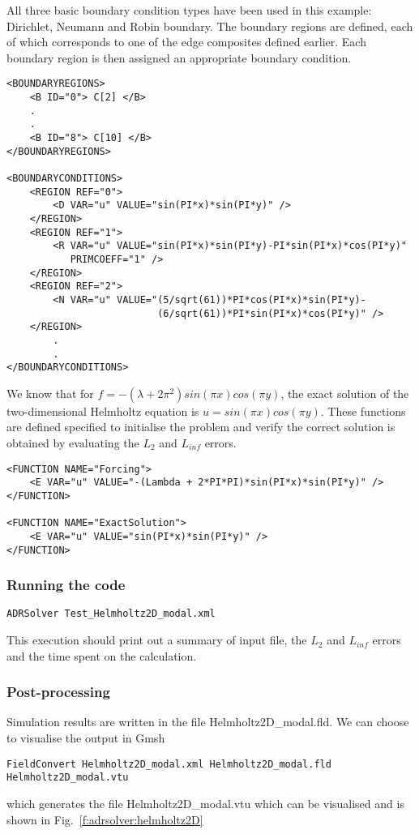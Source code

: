 All three basic boundary condition types have been used in this example:
Dirichlet, Neumann and Robin boundary. The boundary regions are defined, each of
which corresponds to one of the edge composites defined earlier. Each boundary
region is then assigned an appropriate boundary condition.
\begin{lstlisting}[style=XMLStyle]
<BOUNDARYREGIONS>
    <B ID="0"> C[2] </B>
    .
    .
    <B ID="8"> C[10] </B>
</BOUNDARYREGIONS>

<BOUNDARYCONDITIONS>
    <REGION REF="0">
        <D VAR="u" VALUE="sin(PI*x)*sin(PI*y)" />
    </REGION>
    <REGION REF="1">
        <R VAR="u" VALUE="sin(PI*x)*sin(PI*y)-PI*sin(PI*x)*cos(PI*y)" 
           PRIMCOEFF="1" />
    </REGION>
    <REGION REF="2">
        <N VAR="u" VALUE="(5/sqrt(61))*PI*cos(PI*x)*sin(PI*y)-
                          (6/sqrt(61))*PI*sin(PI*x)*cos(PI*y)" />
    </REGION>
        .
        .
</BOUNDARYCONDITIONS>
\end{lstlisting}

We know that for $f = -(\lambda + 2 \pi^2)sin(\pi x)cos(\pi y)$, the exact 
solution of the two-dimensional Helmholtz equation is $u = sin(\pi x)cos(\pi
y)$. These functions are defined specified to initialise the problem and verify
the correct solution is obtained by evaluating the $L_2$ and $L_{inf}$ errors.
\begin{lstlisting}[style=XMLStyle]
<FUNCTION NAME="Forcing">
    <E VAR="u" VALUE="-(Lambda + 2*PI*PI)*sin(PI*x)*sin(PI*y)" />
</FUNCTION>

<FUNCTION NAME="ExactSolution">
    <E VAR="u" VALUE="sin(PI*x)*sin(PI*y)" />
</FUNCTION>
\end{lstlisting}


\subsubsection{Running the code}
\begin{lstlisting}[style=BashInputStyle]
ADRSolver Test_Helmholtz2D_modal.xml
\end{lstlisting}

This execution should print out a summary of input file, the $L_2$ and 
$L_{inf}$ errors and the time spent on the calculation.

\subsubsection{Post-processing}
Simulation results are written in the file Helmholtz2D\_modal.fld. We can choose
to visualise the output in Gmsh
\begin{lstlisting}[style=BashInputStyle]
FieldConvert Helmholtz2D_modal.xml Helmholtz2D_modal.fld Helmholtz2D_modal.vtu
\end{lstlisting}
which generates the file Helmholtz2D\_modal.vtu which can be visualised and is
shown in Fig.~\ref{f:adrsolver:helmholtz2D}

